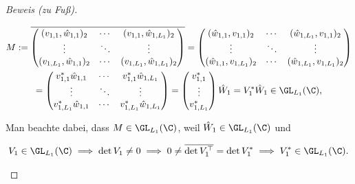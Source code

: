 \begin{proof}[Beweis (zu Fuß)]
\begin{enumerate}[label = (\roman*)]
        \begin{multline*}
            M
            :=
            \overline
            {
                \begin{pmatrix}
                    (v_{1,   1}, \hat w_{1, 1})_2 & \cdots & (v_{1,   1}, \hat w_{1, L_1})_2 \\
                    \vdots                        & \ddots & \vdots                          \\
                    (v_{1, L_1}, \hat w_{1, 1})_2 & \cdots & (v_{1, L_1}, \hat w_{1, L_1})_2 \\
                \end{pmatrix}
            }
            =
            \begin{pmatrix}
                (\hat w_{1, 1}, v_{1,   1})_2 & \cdots & (\hat w_{1, L_1}, v_{1,   1})_2 \\
                \vdots                        & \ddots & \vdots                          \\
                (\hat w_{1, 1}, v_{1, L_1})_2 & \cdots & (\hat w_{1, L_1}, v_{1, L_1})_2 \\
            \end{pmatrix} \\
            =
            \begin{pmatrix}
                v_{1,   1}^\ast \hat w_{1, 1} & \cdots & v_{1,   1}^\ast \hat w_{1, L_1} \\
                \vdots                        & \ddots & \vdots                          \\
                v_{1, L_1}^\ast \hat w_{1, 1} & \cdots & v_{1, L_1}^\ast \hat w_{1, L_1} \\
            \end{pmatrix}
            =
            \begin{pmatrix}
                v_{1, 1}^\ast \\ \vdots \\ v_{1, L_1}^\ast
            \end{pmatrix}
            \hat W_1
            =
            V_1^\ast \hat W_1
            \in
            \GL_{L_1}(\C),
        \end{multline*}

        Man beachte dabei, dass $M \in \GL_{L_1}(\C)$, weil $\hat W_1 \in \GL_{L_1}(\C)$ und

        \begin{align*}
            V_1 \in \GL_{L_1}(\C)
            \implies
            \det V_1 \neq 0
            \implies
            0 \neq \overline{\det V_1^\top} = \det V_1^\ast
            \implies
            V_1^\ast \in \GL_{L_1}(\C).
        \end{align*}


\end{enumerate}
\end{proof}
